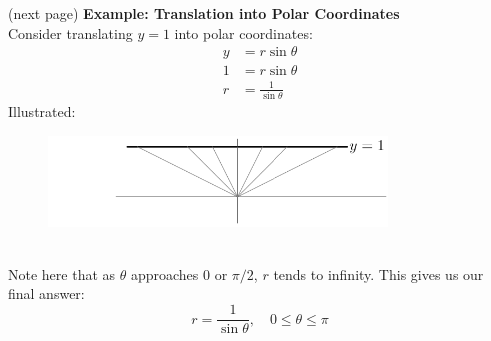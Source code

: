 \documentclass{report}
\begin{document}
(next page)
\newpage
\noindent\textbf{Example: Translation into Polar Coordinates}\\
Consider translating $y=1$ into polar coordinates:
\begin{align*}
y&=r\sin\theta\\
1&=r\sin\theta\\
r&=\frac{1}{\sin\theta}
\end{align*}
Illustrated:
\begin{figure}[h]
\includegraphics[width=9cm]{Capture52}\\
\centering
{}
\end{figure}\\
Note here that as $\theta$ approaches 0 or $\pi/2$, $r$ tends to infinity. This gives us our
final answer:
\begin{equation*}
r=\frac{1}{\sin\theta},\quad0\leq\theta\leq\pi
\end{equation*}
\newpage
\end{document}
